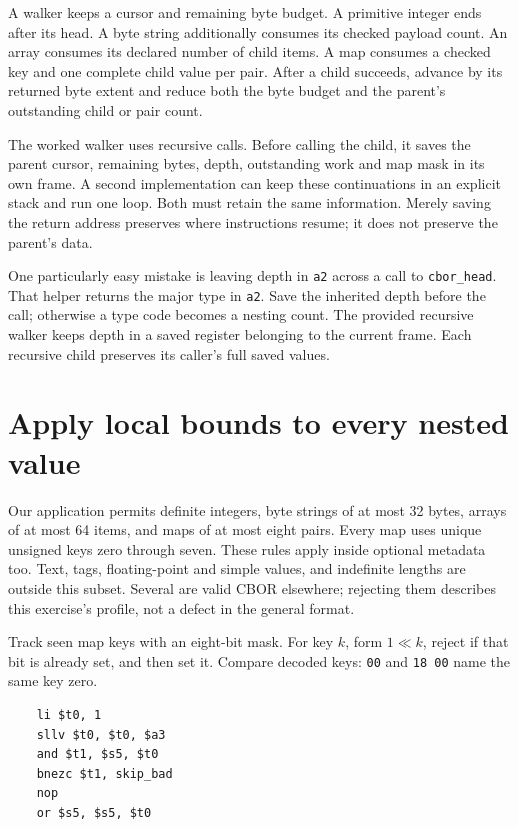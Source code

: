 

A walker keeps a cursor and remaining byte budget. A primitive integer ends
after its head. A byte string additionally consumes its checked payload count.
An array consumes its declared number of child items. A map consumes a checked
key and one complete child value per pair. After a child succeeds, advance by
its returned byte extent and reduce both the byte budget and the parent's
outstanding child or pair count.

The worked walker uses recursive calls. Before calling the child, it saves the
parent cursor, remaining bytes, depth, outstanding work and map mask in its own
frame. A second implementation can keep these continuations in an explicit
stack and run one loop. Both must retain the same information. Merely saving the
return address preserves where instructions resume; it does not preserve the
parent's data.

One particularly easy mistake is leaving depth in \texttt{a2} across a call to
\texttt{cbor\_head}. That helper returns the major type in \texttt{a2}. Save the
inherited depth before the call; otherwise a type code becomes a nesting count.
The provided recursive walker keeps depth in a saved register belonging to the
current frame. Each recursive child preserves its caller's full saved values.

\section{Apply local bounds to every nested value}

Our application permits definite integers, byte strings of at most 32 bytes,
arrays of at most 64 items, and maps of at most eight pairs. Every map uses
unique unsigned keys zero through seven. These rules apply inside optional
metadata too. Text, tags, floating-point and simple values, and indefinite
lengths are outside this subset. Several are valid CBOR elsewhere; rejecting
them describes this exercise's profile, not a defect in the general format.

Track seen map keys with an eight-bit mask. For key $k$, form $1\ll k$, reject
if that bit is already set, and then set it. Compare decoded keys: \texttt{00}
and \texttt{18 00} name the same key zero. 
\begin{verbatim}
    li $t0, 1
    sllv $t0, $t0, $a3
    and $t1, $s5, $t0
    bnezc $t1, skip_bad
    nop
    or $s5, $s5, $t0
\end{verbatim}

